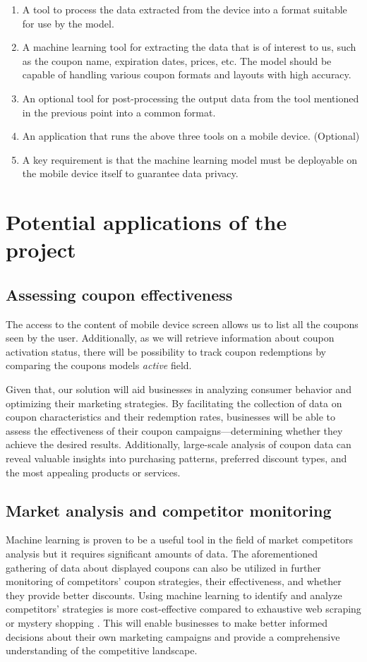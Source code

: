 \documentclass[licencjacka,en]{pracamgr}
\begin{document}
\begin{enumerate}
    \item A tool to process the data extracted from the device into a format suitable for use by the model.
    \item A machine learning tool for extracting the data that is of interest to us, such as the coupon name, expiration dates, prices, etc. The model should be capable of handling various coupon formats and layouts with high accuracy.
    \item An optional tool for post-processing the output data from the tool mentioned in the previous point into a common format.
    \item An application that runs the above three tools on a mobile device. (Optional)
    \item A key requirement is that the machine learning model must be deployable on the mobile device itself to guarantee data privacy.
\end{enumerate} 

\section{Potential applications of the project}
\subsection{Assessing coupon effectiveness}
The access to the content of mobile device screen allows us to list all the coupons seen by the user. Additionally, as we will retrieve information about coupon activation status, there will be possibility to track coupon redemptions by comparing the coupons models \textit{active} field.

Given that, our solution will aid businesses in analyzing consumer behavior and optimizing their marketing strategies. By facilitating the collection of data on coupon characteristics and their redemption rates, businesses will be able to assess the effectiveness of their coupon campaigns—determining whether they achieve the desired results. Additionally, large-scale analysis of coupon data can reveal valuable insights into purchasing patterns, preferred discount types, and the most appealing products or services.

\subsection{Market analysis and competitor monitoring}
Machine learning is proven to be a useful tool in the field of market competitors analysis but it requires significant amounts of data\cite{competitor_tariffs}.
The aforementioned gathering of data about displayed coupons can also be utilized in further monitoring of competitors' coupon strategies, their effectiveness, and whether they provide better discounts. Using machine learning to identify and analyze competitors' strategies is more cost-effective compared to exhaustive web scraping or mystery shopping \cite{competitor_tariffs}. This will enable businesses to make better informed decisions about their own marketing campaigns and provide a comprehensive understanding of the competitive landscape.
\end{document}
